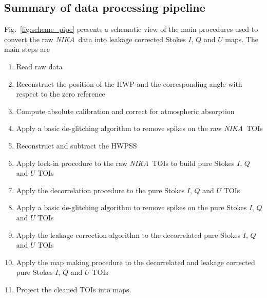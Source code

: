 \documentclass[twocolumn, traditabstract]{aa}
\newcommand{\nika}{{\it NIKA}}
\begin{document}
 \subsection{Summary of data processing pipeline}\label{se:sumpipe}
 Fig.~\ref{fig:scheme_pipe} presents a schematic view of the main procedures used
 to convert the raw \nika\ data into leakage corrected Stokes $I$, $Q$ and $U$
 maps. The main steps are
 \begin{enumerate}
 \item Read raw data
 \item Reconstruct the position of the HWP and the corresponding angle with respect to the zero reference
 \item  Compute absolute calibration and correct for atmospheric absorption
 \item  Apply a basic de-glitching algorithm to remove spikes on the raw \nika\ TOIs
 \item  Reconstruct and subtract the HWPSS
 \item  Apply lock-in procedure to the raw \nika\ TOIs to build pure Stokes $I$, $Q$ and $U$ TOIs
 \item  Apply the decorrelation procedure to the pure Stokes $I$, $Q$ and $U$ TOIs
 \item  Apply a basic de-glitching algorithm to remove spikes on the pure Stokes $I$, $Q$ and $U$ TOIs
 \item  Apply the leakage correction algorithm to the decorrelated pure Stokes $I$, $Q$ and $U$ TOIs
 \item  Apply the map making procedure to the decorrelated and leakage corrected pure Stokes $I$, $Q$ and $U$ TOIs
 \item Project the cleaned TOIs into maps.
 \end{enumerate}
 
\end{document}
